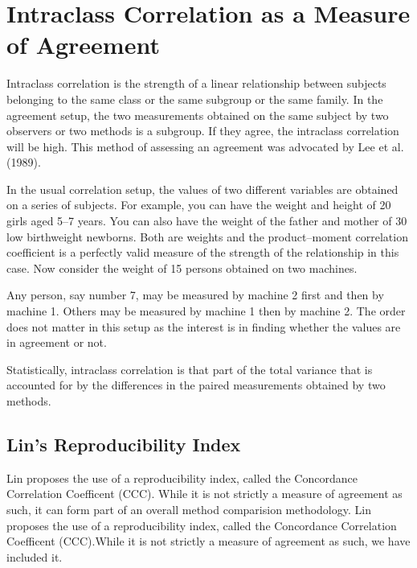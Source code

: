 \documentclass[MAIN.tex]{subfiles}
\begin{document}
\section{Intraclass Correlation as a Measure of Agreement}


Intraclass correlation is the strength of a linear relationship between subjects belonging to the same class or the same subgroup or the same family. In the agreement setup, the two measurements obtained on the same subject by two observers or two methods is a subgroup. If they agree, the intraclass correlation will be high. This method of assessing an agreement was advocated by Lee et al. (1989).

In the usual correlation setup, the values of two different variables are obtained on a series of subjects. For example, you can have the weight and height of 20 girls aged 5–7 years. You can also have the weight of the father and mother of 30 low
birthweight newborns. Both are weights and the product–moment correlation coefficient is a perfectly valid measure of the strength of the relationship in this case.
Now consider the weight of 15 persons obtained on two machines. 

Any person, say number 7, may be measured by machine 2 first and then by machine 1. Others may be measured by machine 1 then by machine 2. The order does not matter in this setup as
the interest is in finding whether the values are in agreement or not.

Statistically, intraclass correlation is that part of the total variance that is accounted for by the differences in the paired measurements obtained by two
methods.

\subsection{Lin's Reproducibility Index}
Lin proposes the use of a reproducibility index, called the Concordance Correlation Coefficent (CCC). While it is not strictly a measure of agreement as such, it can form part of an overall method comparision methodology. Lin proposes the use of a reproducibility index, called the Concordance Correlation Coefficent (CCC).While it is not strictly a measure of agreement as such, we have included it.
\end{document}
